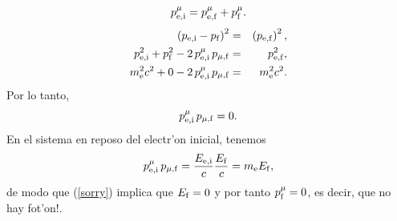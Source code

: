 \begin{itemize}
\begin{equation}
p^\mu_{\rm e,i}=p^\mu_{\rm e,f}+p^\mu_{\rm f}.
\end{equation}
\begin{eqnarray}
\left( p_{\rm e,i}-p_{\rm f}\right)^2 &=&\left( p_{\rm e,f}\right)^2 ,\\
p^2_{\rm e,i}+p^2_{\rm \rm f}-2\,p^\mu_{\rm e,i}\,p_{\mu, \rm f} &=& p^2_{\rm e,f} ,\\
m_{\rm e}^2 c^2+0-2\,p^\mu_{\rm e,i}\,p_{\mu, \rm f} &=& m_{\rm e}^2 c^2.
\end{eqnarray}
Por lo tanto,
\begin{equation}
p^\mu_{\rm e,i}\,p_{\mu, \rm f}=0.\label{sorry}
\end{equation}
En el sistema en reposo del electr'on inicial, tenemos
\begin{equation}
p^\mu_{\rm e,i}\,p_{\mu, \rm f}=\frac{E_{\rm e,i}}{c}\frac{E_{\rm f}}{c} =m_{\rm
e}E_{\rm f},
\end{equation}
de modo que (\ref{sorry}) implica que $E_{\rm f}=0$ y por tanto $p^\mu_{\rm
f}=0$, es decir, que no hay fot'on!.
\end{itemize}
